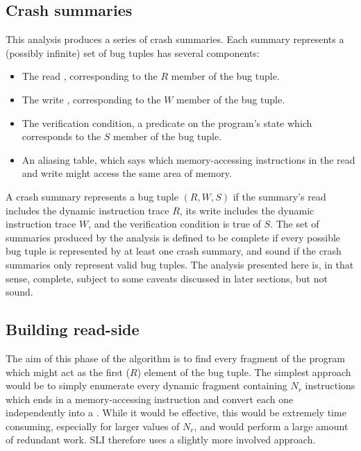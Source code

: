 \documentclass[12pt,a4paper]{book}
\begin{document}
\subsection{Crash summaries}

This analysis produces a series of crash summaries.
Each summary represents a (possibly infinite) set of bug tuples has several components:

\begin{itemize}
\item The read \StateMachine, corresponding to the $R$ member of the bug tuple.
\item The write \StateMachine, corresponding to the $W$ member of the bug tuple.
\item The verification condition, a predicate on the program's state which corresponds to the $S$ member of the bug tuple.
\item An aliasing table, which says which memory-accessing instructions in the read and write \StateMachines might access the same area of memory.
\end{itemize}

A crash summary represents a bug tuple $(R, W, S)$ if the summary's read \StateMachine includes the dynamic instruction trace $R$, its write \StateMachine includes the dynamic instruction trace $W$, and the verification condition is true of $S$.
The set of summaries produced by the analysis is defined to be complete if every possible bug tuple is represented by at least one crash summary, and sound if the crash summaries only represent valid bug tuples.
The analysis presented here is, in that sense, complete, subject to some caveats discussed in later sections, but not sound.

\subsection{Building read-side \StateMachines}

The aim of this phase of the algorithm is to find every fragment of the program which might act as the first ($R$) element of the bug tuple.
The simplest approach would be to simply enumerate every dynamic fragment containing $N_r$ instructions which ends in a memory-accessing instruction and convert each one independently into a \StateMachine.
While it would be effective, this would be extremely time consuming, especially for larger values of $N_r$, and would perform a large amount of redundant work.
SLI therefore uses a slightly more involved approach.
\end{document}
